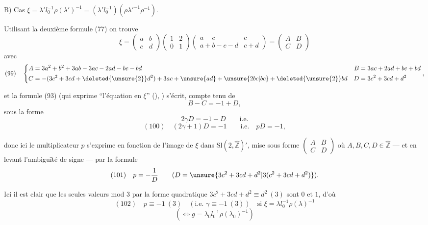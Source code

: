 B) Cas $\xi=\lambda'l_0^{-1}\rho(\lambda')^{-1}=(\lambda'l_0^{-1})(\rho\lambda'^{-1}\rho^{-1})$.

Utilisant la deuxième formule (77) on trouve
\[
\xi=\begin{pmatrix}a&b\\c&d\end{pmatrix}
\begin{pmatrix}1&2\\0&1\end{pmatrix}
\begin{pmatrix}a-c&c\\a+b-c-d&c+d\end{pmatrix}
=\begin{pmatrix}A&B\\C&D\end{pmatrix}
\]
avec
\[
(99)\quad
\left\{\begin{aligned}
A&=3a^2+b^2+3ab-3ac-2ad-bc-bd
& B&=3ac+2ad+bc+bd\\
C&=-(3c^2+3cd+\deleted{\unsure{2}}d^2)+3ac+\unsure{ad}+\unsure{2bc|bc}+\deleted{\unsure{2}}bd
& D&=3c^2+3cd+d^2
\end{aligned}\right.,
\]

et la formule (93) (qui exprime ``l'équation en $\xi$'' (\unsure{**}), ) s'écrit,  compte tenu de
\[
B-C=-1+D,
\]
sous la forme 
\[
2\gamma D=-1-D\qquad\text{i.e.}
\]
\[
(100)\quad \boxed{(2\gamma+1)D=-1\qquad\text{i.e.}\quad pD=-1},
\]

donc ici le multiplicateur $p$ s'exprime en fonction de l'image de $\xi$ dans $\mathrm{Sl}(2,\widehat{\mathbb Z})'$, mise sous forme $\begin{pmatrix}A&B\\C&D\end{pmatrix}$ où $A,B,C,D\in\widehat{\mathbb Z}$ --- et en levant l'ambiguïté de signe  --- par la formule
\[
(101)\quad p=-\frac1D\qquad(D=\unsure{3c^2+3cd+d^2|3(c^2+3cd+d^2)}).
\]


Ici il est clair que les seules valeurs mod $3$  par la forme quadratique $3c^2+3cd+d^2\equiv d^2\ (3)$ sont $0$ et $1$, d'où
\[
(102)\quad p\equiv-1\ (3)\quad(\text{i.e. }\gamma\equiv-1\ (3))\quad\text{si }\xi=\lambda l_0^{-1}\rho(\lambda)^{-1}
\]
\[
(\Longleftrightarrow g=\lambda_0l_0^{-1}\rho(\lambda_0)^{-1})
\]


